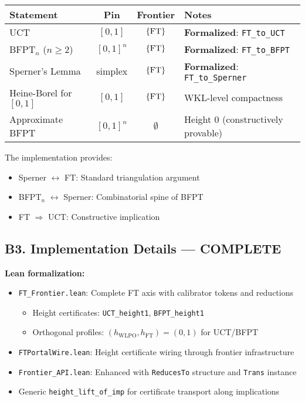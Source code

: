 \documentclass[11pt]{article}
\theoremstyle{definition}
\theoremstyle{remark}
\begin{document}
\begin{center}
\begin{tabular}{l|c|c|p{5cm}}
\hline
\textbf{Statement} & \textbf{Pin} & \textbf{Frontier} & \textbf{Notes} \\
\hline
UCT & $[0,1]$ & $\{\mathrm{FT}\}$ & \textbf{\color{green}Formalized}: \texttt{FT\_to\_UCT} \\
BFPT$_n$ ($n \geq 2$) & $[0,1]^n$ & $\{\mathrm{FT}\}$ & \textbf{\color{green}Formalized}: \texttt{FT\_to\_BFPT} \\
Sperner's Lemma & simplex & $\{\mathrm{FT}\}$ & \textbf{\color{green}Formalized}: \texttt{FT\_to\_Sperner} \\
Heine-Borel for $[0,1]$ & $[0,1]$ & $\{\mathrm{FT}\}$ & WKL-level compactness \\
Approximate BFPT & $[0,1]^n$ & $\emptyset$ & Height 0 (constructively provable) \\
\hline
\end{tabular}
\end{center}

The implementation provides:
\begin{itemize}
\item Sperner $\leftrightarrow$ FT: Standard triangulation argument \cite{Fridman-Simpson}
\item BFPT$_n$ $\leftrightarrow$ Sperner: Combinatorial spine of BFPT
\item FT $\Rightarrow$ UCT: Constructive implication \cite{Ishihara-RM}
\end{itemize}

\subsection{B3. Implementation Details — \textbf{\color{green}COMPLETE}}

\textbf{Lean formalization:}
\begin{itemize}
\item \texttt{FT\_Frontier.lean}: Complete FT axis with calibrator tokens and reductions
  \begin{itemize}
  \item Height certificates: \texttt{UCT\_height1}, \texttt{BFPT\_height1}
  \item Orthogonal profiles: $(h_{\text{WLPO}}, h_{\text{FT}}) = (0, 1)$ for UCT/BFPT
  \end{itemize}
\item \texttt{FTPortalWire.lean}: Height certificate wiring through frontier infrastructure
\item \texttt{Frontier\_API.lean}: Enhanced with \texttt{ReducesTo} structure and \texttt{Trans} instance
\item Generic \texttt{height\_lift\_of\_imp} for certificate transport along implications
\end{itemize}
\end{document}
